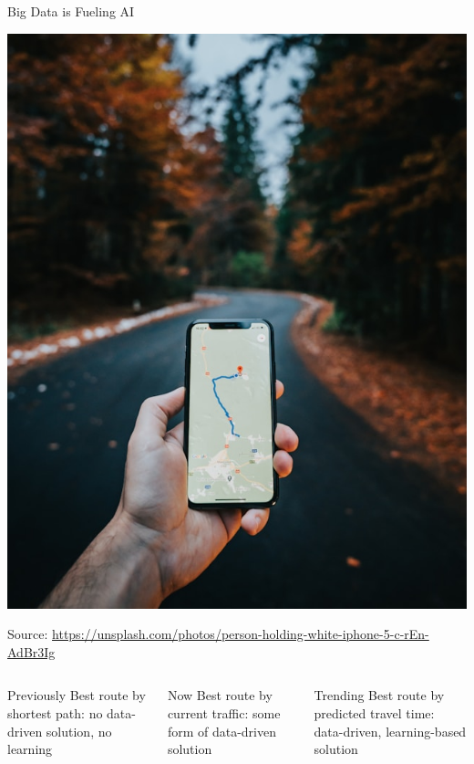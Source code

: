 \documentclass[aspectratio=169,xcolor=dvipsnames,svgnames,x11names,fleqn]{beamer}
\begin{document}
\begin{frame}{Big Data is Fueling AI}

\begin{center}
      \includegraphics[height=.35\textheight]{figures/googlemap.jpg}
      
      Source: \url{https://unsplash.com/photos/person-holding-white-iphone-5-c-rEn-AdBr3Ig}
\end{center}
\begin{columns}
    \begin{redblock}{Previously}
        Best route by shortest path: no data-driven solution, no learning
    \end{redblock}

    \begin{redblock}{Now}
      Best route by current traffic: some form of data-driven solution
    \end{redblock}
    \begin{redblock}{Trending}
      Best route by predicted travel time: data-driven, learning-based solution
    \end{redblock}
\end{columns}
\end{frame}
\end{document}
